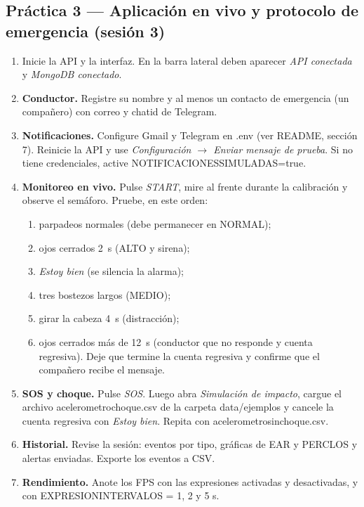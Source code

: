 \documentclass[11pt,a4paper]{article}
\newcommand{\codigoguion}{\textunderscore\allowbreak}
\newcommand{\codigo}[1]{{\small\ttfamily\let\_\codigoguion #1}}
\begin{document}
\subsection{Práctica 3 — Aplicación en vivo y protocolo de emergencia (sesión 3)}
\begin{enumerate}
  \item Inicie la API y la interfaz. En la barra lateral deben aparecer \emph{API conectada} y
        \emph{MongoDB conectado}.
  \item \textbf{Conductor.} Registre su nombre y al menos un contacto de emergencia (un compañero) con
        correo y \codigo{chat\_id} de Telegram.
  \item \textbf{Notificaciones.} Configure Gmail y Telegram en \codigo{.env} (ver README, sección 7).
        Reinicie la API y use \emph{Configuración $\rightarrow$ Enviar mensaje de prueba}. Si no tiene
        credenciales, active \codigo{NOTIFICACIONES\_SIMULADAS=true}.
  \item \textbf{Monitoreo en vivo.} Pulse \emph{START}, mire al frente durante la calibración y observe el
        semáforo. Pruebe, en este orden:
        \begin{enumerate}[label=\alph*)]
          \item parpadeos normales (debe permanecer en NORMAL);
          \item ojos cerrados \SI{2}{s} (ALTO y sirena);
          \item \emph{Estoy bien} (se silencia la alarma);
          \item tres bostezos largos (MEDIO);
          \item girar la cabeza \SI{4}{s} (distracción);
          \item ojos cerrados más de \SI{12}{s} (conductor que no responde y cuenta regresiva). Deje que
                termine la cuenta regresiva y confirme que el compañero recibe el mensaje.
        \end{enumerate}
  \item \textbf{SOS y choque.} Pulse \emph{SOS}. Luego abra \emph{Simulación de impacto}, cargue el archivo
        \codigo{acelerometro\_choque.csv} de la carpeta \codigo{data/ejemplos} y cancele la cuenta regresiva con
        \emph{Estoy bien}. Repita con \codigo{acelerometro\_sin\_choque.csv}.
  \item \textbf{Historial.} Revise la sesión: eventos por tipo, gráficas de EAR y PERCLOS y alertas enviadas.
        Exporte los eventos a CSV.
  \item \textbf{Rendimiento.} Anote los FPS con las expresiones activadas y desactivadas, y con
        \codigo{EXPRESION\_INTERVALO\_S} = 1, 2 y 5 s.
\end{enumerate}
\end{document}
